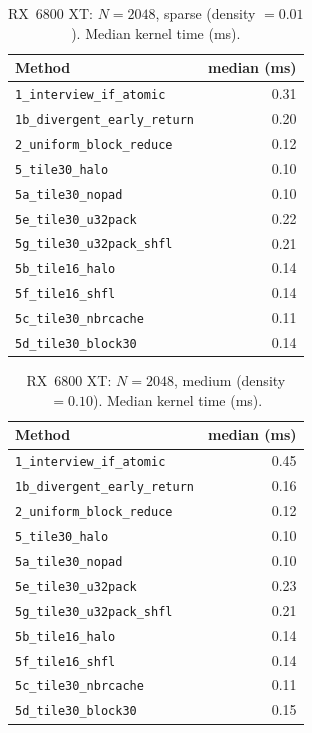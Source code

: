 \documentclass[11pt,a4paper]{article}
\begin{document}
\begin{table}[htbp]
  \centering
  \footnotesize
  \caption{RX~6800 XT: $N=2048$, sparse (density $=0.01$). Median kernel time (ms).}
  \label{tab:amd-2048-sparse}
  \begin{tabular}{@{}p{5.1cm}r@{}}
    \toprule
    Method & median (ms) \\
    \midrule
    \texttt{1\_interview\_if\_atomic}      & 0.31 \\
    \texttt{1b\_divergent\_early\_return} & 0.20 \\
    \texttt{2\_uniform\_block\_reduce}    & 0.12 \\
    \texttt{5\_tile30\_halo}              & 0.10 \\
    \texttt{5a\_tile30\_nopad}            & 0.10 \\
    \texttt{5e\_tile30\_u32pack}          & 0.22 \\
    \texttt{5g\_tile30\_u32pack\_shfl}    & 0.21 \\
    \texttt{5b\_tile16\_halo}              & 0.14 \\
    \texttt{5f\_tile16\_shfl}             & 0.14 \\
    \texttt{5c\_tile30\_nbrcache}          & 0.11 \\
    \texttt{5d\_tile30\_block30}          & 0.14 \\
    \bottomrule
  \end{tabular}
\end{table}

\begin{table}[htbp]
  \centering
  \footnotesize
  \caption{RX~6800 XT: $N=2048$, medium (density $=0.10$). Median kernel time (ms).}
  \label{tab:amd-2048-medium}
  \begin{tabular}{@{}p{5.1cm}r@{}}
    \toprule
    Method & median (ms) \\
    \midrule
    \texttt{1\_interview\_if\_atomic}      & 0.45 \\
    \texttt{1b\_divergent\_early\_return} & 0.16 \\
    \texttt{2\_uniform\_block\_reduce}    & 0.12 \\
    \texttt{5\_tile30\_halo}              & 0.10 \\
    \texttt{5a\_tile30\_nopad}            & 0.10 \\
    \texttt{5e\_tile30\_u32pack}          & 0.23 \\
    \texttt{5g\_tile30\_u32pack\_shfl}    & 0.21 \\
    \texttt{5b\_tile16\_halo}              & 0.14 \\
    \texttt{5f\_tile16\_shfl}             & 0.14 \\
    \texttt{5c\_tile30\_nbrcache}          & 0.11 \\
    \texttt{5d\_tile30\_block30}          & 0.15 \\
    \bottomrule
  \end{tabular}
\end{table}
\end{document}
